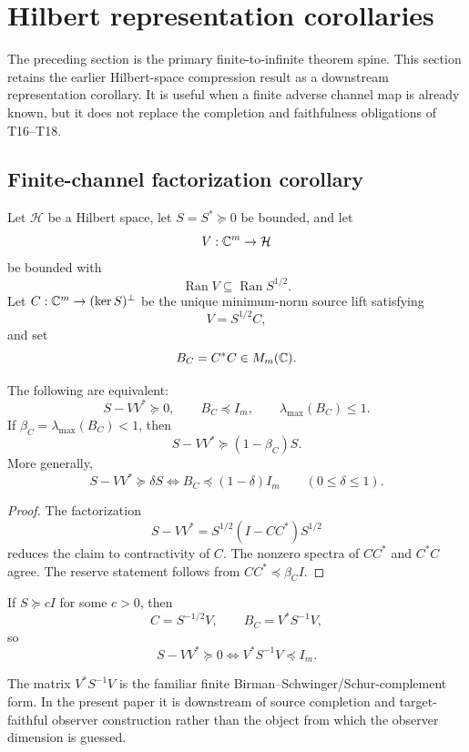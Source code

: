 \section{Hilbert representation corollaries}

The preceding section is the primary finite-to-infinite theorem spine.  This section retains the earlier Hilbert-space compression result as a downstream representation corollary.  It is useful when a finite adverse channel map is already known, but it does not replace the completion and faithfulness obligations of T16--T18.

\subsection{Finite-channel factorization corollary}

Let $\mathcal H$ be a Hilbert space, let $S=S^*\succeq0$ be bounded, and let
\[
V:\mathbb C^m\to\mathcal H
\]
be bounded with
\[
\operatorname{Ran}V\subseteq\operatorname{Ran}S^{1/2}.
\]
Let $C:\mathbb C^m\to(\ker S)^\perp$ be the unique minimum-norm source lift satisfying
\[
V=S^{1/2}C,
\]
and set
\[
B_C=C^*C\in M_m(\mathbb C).
\]

\begin{corollary}
The following are equivalent:
\[
S-VV^*\succeq0,
\qquad
B_C\preceq I_m,
\qquad
\lambda_{\max}(B_C)\le1.
\]
If $\beta_C=\lambda_{\max}(B_C)<1$, then
\[
S-VV^*\succeq(1-\beta_C)S.
\]
More generally,
\[
S-VV^*\succeq\delta S
\iff
B_C\preceq(1-\delta)I_m
\qquad(0\le\delta\le1).
\]
\end{corollary}

\begin{proof}
The factorization
\[
S-VV^*=S^{1/2}(I-CC^*)S^{1/2}
\]
reduces the claim to contractivity of $C$.  The nonzero spectra of $CC^*$ and $C^*C$ agree.  The reserve statement follows from $CC^*\preceq\beta_C I$.
\end{proof}

\begin{corollary}
If $S\succeq cI$ for some $c>0$, then
\[
C=S^{-1/2}V,
\qquad
B_C=V^*S^{-1}V,
\]
so
\[
S-VV^*\succeq0
\iff
V^*S^{-1}V\preceq I_m.
\]
\end{corollary}

\begin{remark}
The matrix $V^*S^{-1}V$ is the familiar finite Birman--Schwinger/Schur-complement form.  In the present paper it is downstream of source completion and target-faithful observer construction rather than the object from which the observer dimension is guessed.
\end{remark}

